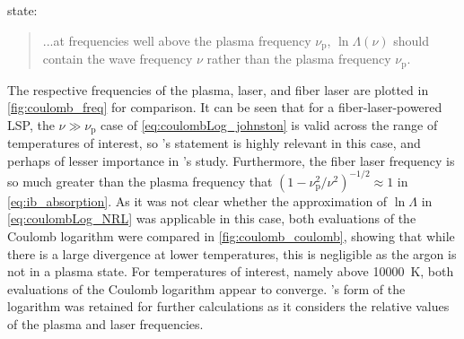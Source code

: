         
        \textcite{johnstonCorrectValuesHighfrequency1973} state:
        \begin{quote}
            ...at frequencies well above the plasma frequency $\nu_\mathrm{p}$, $\ln{\Lambda}(\nu)$ should contain the wave frequency $\nu$ rather than the plasma frequency $\nu_\mathrm{p}$.
        \end{quote}
        The respective frequencies of the plasma,  laser, and fiber laser are plotted in \autoref{fig:coulomb_freq} for comparison. It can be seen that for a fiber-laser-powered LSP, the $\nu \gg \nu_\mathrm{p}$ case of \autoref{eq:coulombLog_johnston} is valid across the range of temperatures of interest, so \citeauthor{johnstonCorrectValuesHighfrequency1973}'s statement is highly relevant in this case, and perhaps of lesser importance in \citeauthor{nassarInvestigationLasersustainedPlasma2012}'s study. Furthermore, the fiber laser frequency is so much greater than the plasma frequency that $(1-\nu_\mathrm{p}^2/\nu^2)^{-1/2} \approx 1$ in \autoref{eq:ib_absorption}. As it was not clear whether the approximation of $\ln{\Lambda}$ in \autoref{eq:coulombLog_NRL} was applicable in this case, both evaluations of the Coulomb logarithm were compared in \autoref{fig:coulomb_coulomb}, showing that while there is a large divergence at lower temperatures, this is negligible as the argon is not in a plasma state. For temperatures of interest, namely above \qty{10000}{K}, both evaluations of the Coulomb logarithm appear to converge. \citeauthor{johnstonCorrectValuesHighfrequency1973}'s form of the logarithm was retained for further calculations as it considers the relative values of the plasma and laser frequencies.

